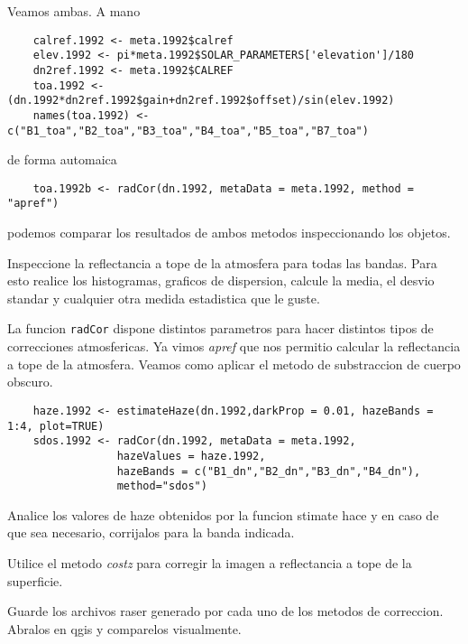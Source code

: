 \documentclass[a4paper]{article}
\begin{document}
Veamos ambas. A mano

\begin{lstlisting}
    calref.1992 <- meta.1992$calref
    elev.1992 <- pi*meta.1992$SOLAR_PARAMETERS['elevation']/180
    dn2ref.1992 <- meta.1992$CALREF
    toa.1992 <- (dn.1992*dn2ref.1992$gain+dn2ref.1992$offset)/sin(elev.1992)
    names(toa.1992) <- c("B1_toa","B2_toa","B3_toa","B4_toa","B5_toa","B7_toa")
\end{lstlisting}

de forma automaica

\begin{lstlisting}
    toa.1992b <- radCor(dn.1992, metaData = meta.1992, method = "apref")
\end{lstlisting}

podemos comparar los resultados de ambos metodos inspeccionando los objetos.

\begin{act}
    Inspeccione la reflectancia a tope de la atmosfera para todas las bandas.
    Para esto realice los histogramas, graficos de dispersion, calcule la media,
    el desvio standar y cualquier otra medida estadistica que le guste.
\end{act}

La funcion \texttt{radCor} dispone distintos parametros para hacer distintos
tipos de correcciones atmosfericas. Ya vimos \emph{apref} que nos permitio
calcular la reflectancia a tope de la atmosfera. Veamos como aplicar el metodo
de substraccion de cuerpo obscuro.

\begin{lstlisting}
    haze.1992 <- estimateHaze(dn.1992,darkProp = 0.01, hazeBands = 1:4, plot=TRUE)
    sdos.1992 <- radCor(dn.1992, metaData = meta.1992, 
                 hazeValues = haze.1992,
                 hazeBands = c("B1_dn","B2_dn","B3_dn","B4_dn"), 
                 method="sdos")
\end{lstlisting}

\begin{act}
    Analice los valores de haze obtenidos por la funcion stimate hace y en caso
    de que sea necesario, corrijalos para la banda indicada.
\end{act}

\begin{act}
    Utilice el metodo \emph{costz} para corregir la imagen a reflectancia a tope
    de la superficie.
\end{act}

\begin{act}
    Guarde los archivos raser generado por cada uno de los metodos de
    correccion. Abralos en qgis y comparelos visualmente.    
\end{act}
\end{document}
